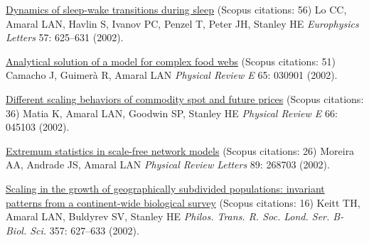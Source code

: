 \NumberedItem{\makebox[0.8cm][r]{[43]}}
\href{/people/amaral/dynamics-of-sleep-wake-transitions-during-sleep}
{Dynamics of sleep-wake transitions during sleep}
    (Scopus citations: 56)
\newline
Lo CC, Amaral LAN, Havlin S, Ivanov PC, Penzel T, Peter JH, Stanley HE
\newline
\textit{Europhysics Letters}
    57:
625--631 (2002).
\newline
\Gap
~
\Gap

\NumberedItem{\makebox[0.8cm][r]{[42]}}
\href{/people/amaral/analytical-solution-of-a-model-for-complex-food-webs}
{Analytical solution of a model for complex food webs}
    (Scopus citations: 51)
\newline
Camacho J, Guimer\`a R, Amaral LAN
\newline
\textit{Physical Review E}
    65:
030901 (2002).
\newline
\Gap
~
\Gap

\NumberedItem{\makebox[0.8cm][r]{[41]}}
\href{/people/amaral/different-scaling-behaviors-of-commodity-spot-and-future-prices}
{Different scaling behaviors of commodity spot and future prices}
    (Scopus citations: 36)
\newline
Matia K, Amaral LAN, Goodwin SP, Stanley HE
\newline
\textit{Physical Review E}
    66:
045103 (2002).
\newline
\Gap
~
\Gap

\NumberedItem{\makebox[0.8cm][r]{[40]}}
\href{/people/amaral/extremum-statistics-in-scale-free-network-models}
{Extremum statistics in scale-free network models}
    (Scopus citations: 26)
\newline
Moreira AA, Andrade JS, Amaral LAN
\newline
\textit{Physical Review Letters}
    89:
268703 (2002).
\newline
\Gap
~
\Gap

\NumberedItem{\makebox[0.8cm][r]{[39]}}
\href{/people/amaral/scaling-in-the-growth-of-geographically-subdivided-populations-invariant-patterns-from-a-continent-wide-biological-survey}
{Scaling in the growth of geographically subdivided populations: invariant patterns from a continent-wide biological survey}
    (Scopus citations: 16)
\newline
Keitt TH, Amaral LAN, Buldyrev SV, Stanley HE
\newline
\textit{Philos. Trans. R. Soc. Lond. Ser. B-Biol. Sci.}
    357:
627--633 (2002).
\newline
\Gap
~
\Gap

